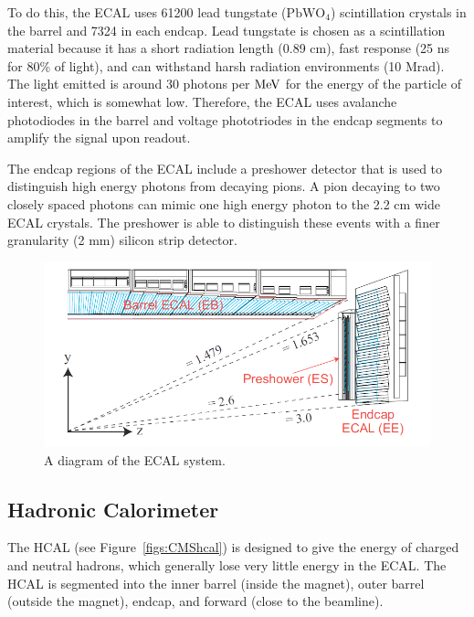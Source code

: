 To do this, the ECAL uses 61200 lead tungstate ($\mathrm{PbWO_4}$) scintillation crystals in the barrel and 7324 in each endcap.  
Lead tungstate is chosen as a scintillation material because it has a short radiation length (0.89 cm), fast response (25 ns for 80\% of light), and can 
withstand harsh radiation environments (10 Mrad).
The light emitted is around 30 photons per $\mathrm{MeV}$ for the energy of the particle of interest, which is somewhat low.  
Therefore, the ECAL uses avalanche photodiodes in the barrel and voltage phototriodes in the endcap segments to amplify the signal upon readout.  

The endcap regions of the ECAL include a preshower detector that is used to distinguish high energy photons from decaying pions.  
A pion decaying to two closely spaced photons can mimic one high energy photon to the 2.2 cm wide ECAL crystals.  
The preshower is able to distinguish these events with a finer granularity (2 mm) silicon strip detector.   
 
\begin{figure}
\begin{center}
\includegraphics[width=1.0\linewidth]{figs/CMSecal.png}
\caption{A diagram of the ECAL system.}
\label{figs:CMSecal}
\end{center}
\end{figure}
  





\subsection{Hadronic Calorimeter}
The HCAL (see Figure~\ref{figs:CMShcal}) is designed to give the energy of charged and neutral hadrons, which generally lose very little energy in the ECAL.  
The HCAL is segmented into the inner barrel (inside the magnet), outer barrel (outside the magnet), endcap, and forward (close to the beamline).  

